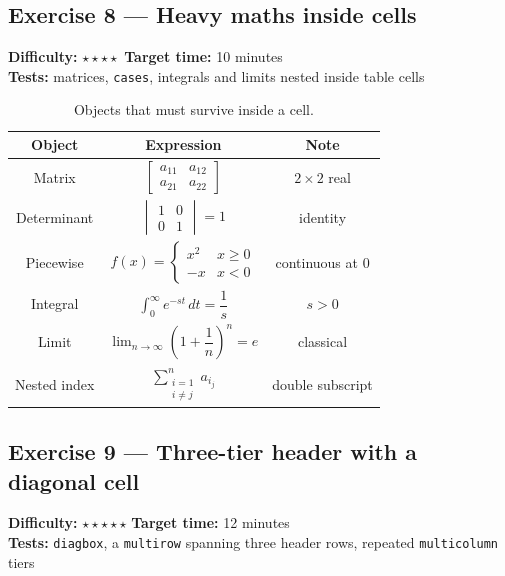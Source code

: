 \documentclass[11pt]{article}
\newcommand{\exinfo}[3]{%
  \par\noindent
  \colorbox{RoyalBlue!12}{\parbox{0.97\textwidth}{\small
  \textbf{Difficulty:} #1 \qquad \textbf{Target time:} #2 \\
  \textbf{Tests:} #3}}\par\medskip}
\begin{document}
\subsection*{Exercise 8 --- Heavy maths inside cells}
\exinfo{$\star\star\star\star$}{10 minutes}{matrices, \texttt{cases},
integrals and limits nested inside table cells}

\begin{table}[H]
\centering
\caption{Objects that must survive inside a cell.}
\renewcommand{\arraystretch}{2.0}
\begin{tabular}{|c|c|c|}
\hline
\textbf{Object} & \textbf{Expression} & \textbf{Note} \\
\hline
Matrix &
  $\begin{bmatrix} a_{11} & a_{12} \\ a_{21} & a_{22} \end{bmatrix}$ &
  $2 \times 2$ real \\
\hline
Determinant &
  $\begin{vmatrix} 1 & 0 \\ 0 & 1 \end{vmatrix} = 1$ &
  identity \\
\hline
Piecewise &
  $f(x) = \begin{cases} x^2 & x \geq 0 \\ -x & x < 0 \end{cases}$ &
  continuous at $0$ \\
\hline
Integral &
  $\displaystyle\int_{0}^{\infty} e^{-st} \, dt = \dfrac{1}{s}$ &
  $s > 0$ \\
\hline
Limit &
  $\displaystyle\lim_{n \to \infty} \left(1 + \dfrac{1}{n}\right)^{n} = e$ &
  classical \\
\hline
Nested index &
  $\displaystyle\sum_{\substack{i=1 \\ i \neq j}}^{n} a_{i_{j}}$ &
  double subscript \\
\hline
\end{tabular}
\end{table}

\newpage
\subsection*{Exercise 9 --- Three-tier header with a diagonal cell}
\exinfo{$\star\star\star\star\star$}{12 minutes}{\texttt{diagbox}, a
\texttt{multirow} spanning three header rows, repeated
\texttt{multicolumn} tiers}
\end{document}
